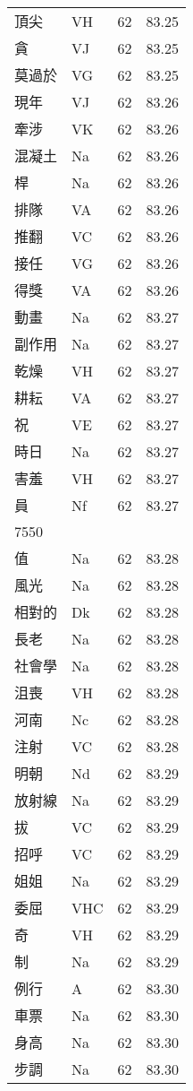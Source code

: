 \documentclass[twocolumn]{book}
\begin{document}
\begin{supertabular}{llrr}
頂尖 & VH & 62 &  83.25\\
貪 & VJ & 62 &  83.25\\
莫過於 & VG & 62 &  83.25\\
現年 & VJ & 62 &  83.26\\
牽涉 & VK & 62 &  83.26\\
混凝土 & Na & 62 &  83.26\\
桿 & Na & 62 &  83.26\\
排隊 & VA & 62 &  83.26\\
推翻 & VC & 62 &  83.26\\
接任 & VG & 62 &  83.26\\
得獎 & VA & 62 &  83.26\\
動畫 & Na & 62 &  83.27\\
副作用 & Na & 62 &  83.27\\
乾燥 & VH & 62 &  83.27\\
耕耘 & VA & 62 &  83.27\\
祝 & VE & 62 &  83.27\\
時日 & Na & 62 &  83.27\\
害羞 & VH & 62 &  83.27\\
員 & Nf & 62 &  83.27\\
7550\\
值 & Na & 62 &  83.28\\
風光 & Na & 62 &  83.28\\
相對的 & Dk & 62 &  83.28\\
長老 & Na & 62 &  83.28\\
社會學 & Na & 62 &  83.28\\
沮喪 & VH & 62 &  83.28\\
河南 & Nc & 62 &  83.28\\
注射 & VC & 62 &  83.28\\
明朝 & Nd & 62 &  83.29\\
放射線 & Na & 62 &  83.29\\
拔 & VC & 62 &  83.29\\
招呼 & VC & 62 &  83.29\\
姐姐 & Na & 62 &  83.29\\
委屈 & VHC & 62 &  83.29\\
奇 & VH & 62 &  83.29\\
制 & Na & 62 &  83.29\\
例行 & A & 62 &  83.30\\
車票 & Na & 62 &  83.30\\
身高 & Na & 62 &  83.30\\
步調 & Na & 62 &  83.30\\

\end{supertabular}
\end{document}
